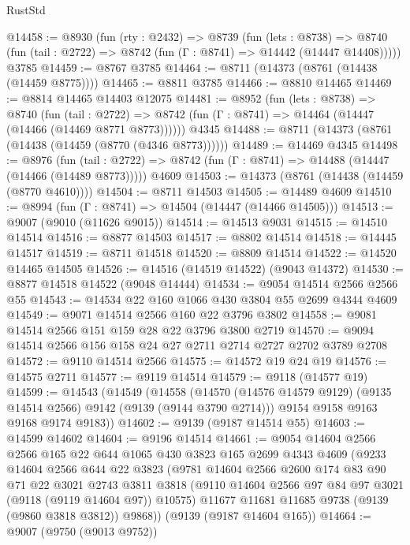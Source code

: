\begin{lexlean}{RustStd}
\begin{coremodule}
@14458 := @8930
    (fun (rty : @2432) =>
    @8739
      (fun (lets : @8738) =>
      @8740 (fun (tail : @2722) => @8742 (fun (Γ : @8741) => @14442 (@14447 @14408)))))
    @3785
@14459 := @8767 @3785
@14464 := @8711 (@14373 (@8761 (@14438 (@14459 @8775))))
@14465 := @8811 @3785
@14466 := @8810 @14465
@14469 := @8814 @14465 @14403 @12075
@14481 := @8952
    (fun (lets : @8738) =>
    @8740
      (fun (tail : @2722) =>
      @8742 (fun (Γ : @8741) => @14464 (@14447 (@14466 (@14469 @8771 @8773))))))
    @4345
@14488 := @8711 (@14373 (@8761 (@14438 (@14459 (@8770 (@4346 @8773))))))
@14489 := @14469 @4345
@14498 := @8976
    (fun (tail : @2722) => @8742 (fun (Γ : @8741) => @14488 (@14447 (@14466 (@14489 @8773)))))
    @4609
@14503 := @14373 (@8761 (@14438 (@14459 (@8770 @4610))))
@14504 := @8711 @14503
@14505 := @14489 @4609
@14510 := @8994 (fun (Γ : @8741) => @14504 (@14447 (@14466 @14505)))
@14513 := @9007 (@9010 (@11626 @9015))
@14514 := @14513 @9031
@14515 := @14510 @14514
@14516 := @8877 @14503
@14517 := @8802 @14514
@14518 := @14445 @14517
@14519 := @8711 @14518
@14520 := @8809 @14514
@14522 := @14520 @14465 @14505
@14526 := @14516 (@14519 @14522) (@9043 @14372)
@14530 := @8877 @14518 @14522 (@9048 @14444)
@14534 := @9054 @14514 @2566 @2566 @55
@14543 := @14534 @22 @160 @1066 @430 @3804 @55 @2699 @4344 @4609
@14549 := @9071 @14514 @2566 @160 @22 @3796 @3802
@14558 := @9081 @14514 @2566 @151 @159 @28 @22 @3796 @3800 @2719
@14570 := @9094 @14514 @2566 @156 @158 @24 @27 @2711 @2714 @2727 @2702 @3789 @2708
@14572 := @9110 @14514 @2566
@14575 := @14572 @19 @24 @19
@14576 := @14575 @2711
@14577 := @9119 @14514
@14579 := @9118 (@14577 @19)
@14599 := @14543
    (@14549
      (@14558
        (@14570 (@14576 @14579 @9129) (@9135 @14514 @2566) @9142 (@9139 (@9144 @3790 @2714)))
        @9154
        @9158
        @9163
        @9168
        @9174
        @9183))
@14602 := @9139 (@9187 @14514 @55)
@14603 := @14599 @14602
@14604 := @9196 @14514
@14661 := @9054
    @14604
    @2566
    @2566
    @165
    @22
    @644
    @1065
    @430
    @3823
    @165
    @2699
    @4343
    @4609
    (@9233
      @14604
      @2566
      @644
      @22
      @3823
      (@9781
        @14604
        @2566
        @2600
        @174
        @83
        @90
        @71
        @22
        @3021
        @2743
        @3811
        @3818
        (@9110 @14604 @2566 @97 @84 @97 @3021 (@9118 (@9119 @14604 @97)) @10575)
        @11677
        @11681
        @11685
        @9738
        (@9139 (@9860 @3818 @3812))
        @9868))
    (@9139 (@9187 @14604 @165))
@14664 := @9007 (@9750 (@9013 @9752))

\end{coremodule}
\end{lexlean}
